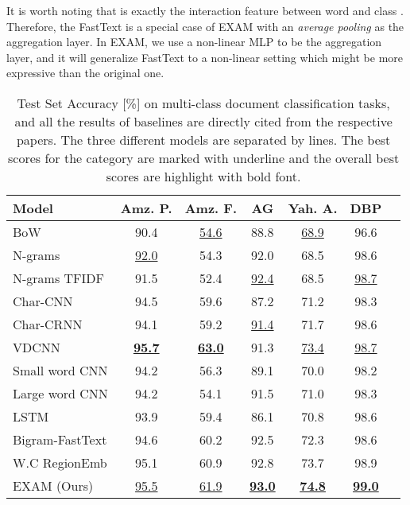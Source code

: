 \documentclass[letterpaper]{article} \usepackage{aaai19}  \usepackage{times}  \usepackage{helvet}  \usepackage{courier}  \usepackage{url}  \usepackage{graphicx}
\begin{document}
It is worth noting that  is exactly the interaction feature between word  and class . Therefore, the FastText is a special case of EXAM with an \textit{average pooling} as the aggregation layer. In EXAM, we use a non-linear MLP to be the aggregation layer, and it will generalize FastText to a non-linear setting which might be more expressive than the original one.
 \begin{table*}
  \caption{Test Set Accuracy [\%] on multi-class document classification tasks, and all the results of baselines are directly cited from the respective papers. The three different models are separated by lines. The best scores for the category are marked with underline and the overall best scores are highlight with bold font.}
  \label{multi-class}
  \centering
  \begin{tabular}{lcccccc}
    \toprule
    Model   &Amz. P. & Amz. F. &AG    &Yah. A. & DBP \\
    \midrule
    BoW \cite{charcnn}  & 90.4&\underline{54.6}  &88.8  &\underline{68.9} &96.6    \\
    N-grams \cite{charcnn}  &\underline{92.0} &54.3 &92.0  &68.5 &98.6    \\
    N-grams TFIDF \cite{charcnn} &91.5 & 52.4 &\underline{92.4}  &68.5 &\underline{98.7}  \\
    \midrule
    Char-CNN \cite{charcnn}  &94.5 & 59.6 &87.2  &71.2 &98.3    \\
    Char-CRNN \cite{charcnn}  &94.1 & 59.2 &\underline{91.4}  &71.7 &98.6      \\    
    VDCNN \cite{vdcnn} &\underline{\textbf{95.7}} & \underline{\textbf{63.0}} &91.3  &\underline{73.4} &\underline{98.7}    \\
    \midrule
    Small word CNN \cite{charcnn}  &94.2 & 56.3 &89.1 &70.0 &98.2      \\
    Large word CNN \cite{charcnn}  &94.2 & 54.1 &91.5  &71.0 &98.3      \\
    LSTM \cite{charcnn} &93.9 &59.4 &86.1 &70.8 &98.6\\
    Bigram-FastText \cite{fasttext} &94.6 &60.2 &92.5 &72.3 &98.6\\
    W.C RegionEmb \cite{regionemb} &95.1 &60.9 &92.8 &73.7 &98.9 \\
    EXAM (Ours)  &\underline{95.5} &\underline{61.9} & \underline{\textbf{93.0}}& \underline{\textbf{74.8}}& \underline{\textbf{99.0}}\\
    \bottomrule
  \end{tabular}
\end{table*}
\end{document}
